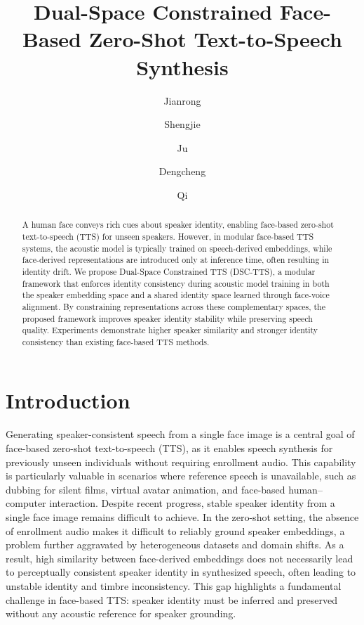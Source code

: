\documentclass[cameraready]{Interspeech}
\title{Dual-Space Constrained Face-Based Zero-Shot Text-to-Speech Synthesis}
\author[affiliation={1}]{Jianrong}{Wang}
\author[affiliation={1}]{Shengjie}{Zhou}
\author[affiliation={2}, correspondingauthor]{Ju}{Zhang}
\author[affiliation={1}]{Dengcheng}{Hu}
\author[affiliation={3}]{Qi}{Li}
\begin{document}
\maketitle

\begin{abstract}

A human face conveys rich cues about speaker identity, enabling face-based zero-shot text-to-speech (TTS) for unseen speakers. However, in modular face-based TTS systems, the acoustic model is typically trained on speech-derived embeddings, while face-derived representations are introduced only at inference time, often resulting in identity drift. We propose Dual-Space Constrained TTS (DSC-TTS), a modular framework that enforces identity consistency during acoustic model training in both the speaker embedding space and a shared identity space learned through face-voice alignment. By constraining representations across these complementary spaces, the proposed framework improves speaker identity stability while preserving speech quality. Experiments demonstrate higher speaker similarity and stronger identity consistency than existing face-based TTS methods.

\end{abstract}

\section{Introduction}

Generating speaker-consistent speech from a single face image is a central goal of face-based zero-shot text-to-speech (TTS), as it enables speech synthesis for previously unseen individuals without requiring enrollment audio. This capability is particularly valuable in scenarios where reference speech is unavailable, such as dubbing for silent films, virtual avatar animation, and face-based human--computer interaction. Despite recent progress, stable speaker identity from a single face image remains difficult to achieve. In the zero-shot setting, the absence of enrollment audio makes it difficult to reliably ground speaker embeddings, a problem further aggravated by heterogeneous datasets and domain shifts. As a result, high similarity between face-derived embeddings does not necessarily lead to perceptually consistent speaker identity in synthesized speech, often leading to unstable identity and timbre inconsistency. This gap highlights a fundamental challenge in face-based TTS: speaker identity must be inferred and preserved without any acoustic reference for speaker grounding.
\end{document}
